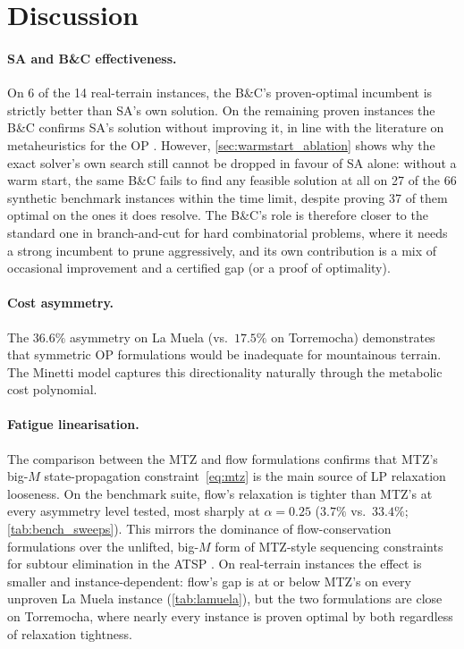 \documentclass[11pt,a4paper]{article}
\begin{document}
\section{Discussion}
\label{sec:discussion}

\paragraph{SA and B\&C effectiveness.}
On 6 of the 14 real-terrain instances, the B\&C's proven-optimal incumbent is strictly better than SA's own solution.
On the remaining proven instances the B\&C confirms SA's solution without improving it, in line with the literature on metaheuristics for the OP \citep{vansteenwegen2011orienteering}. However, \cref{sec:warmstart_ablation} shows why the exact solver's own search still cannot be dropped in favour of SA alone: without a warm start, the same B\&C fails to find any feasible solution at all on 27 of the 66 synthetic benchmark instances within the time limit, despite proving 37 of them optimal on the ones it does resolve.
The B\&C's role is therefore closer to the standard one in branch-and-cut for hard combinatorial problems, where it needs a strong incumbent to prune aggressively, and its own contribution is a mix of occasional improvement and a certified gap (or a proof of optimality).

\paragraph{Cost asymmetry.}
The $36.6\%$ asymmetry on La Muela (vs.\ $17.5\%$ on Torremocha) demonstrates that symmetric OP formulations would be inadequate for mountainous terrain.
The Minetti model captures this directionality naturally through the metabolic cost polynomial.

\paragraph{Fatigue linearisation.}
The comparison between the MTZ and flow formulations confirms that MTZ's big-$M$ state-propagation constraint~\eqref{eq:mtz} is the main source of LP relaxation looseness. On the benchmark suite, flow's relaxation is tighter than MTZ's at every asymmetry level tested, most sharply at $\alpha = 0.25$ ($3.7\%$ vs.\ $33.4\%$; \cref{tab:bench_sweeps}). This mirrors the dominance of flow-conservation formulations over the unlifted, big-$M$ form of MTZ-style sequencing constraints for subtour elimination in the ATSP \citep{oncan2009comparative}.
On real-terrain instances the effect is smaller and instance-dependent: flow's gap is at or below MTZ's on every unproven La Muela instance (\cref{tab:lamuela}), but the two formulations are close on Torremocha, where nearly every instance is proven optimal by both regardless of relaxation tightness.
\end{document}
